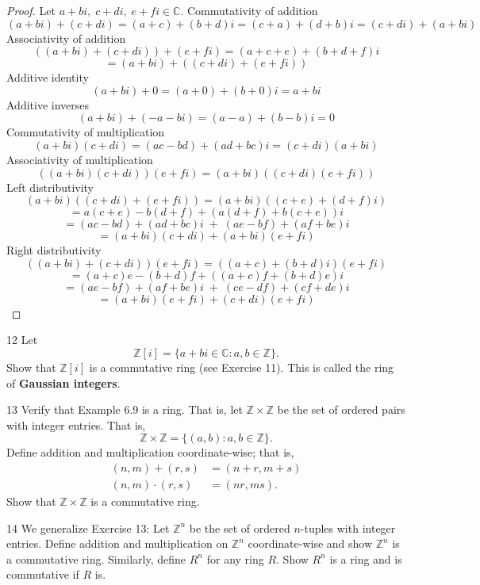 \begin{proof}
    Let $a+bi,\; c+di,\; e+fi \in \mathbb{C}$.
    Commutativity of addition
    \[
    (a+bi)+(c+di)
    = (a+c) + (b+d)i
    = (c+a) + (d+b)i
    = (c+di)+(a+bi)
    \]
    Associativity of addition
    \[
    ((a+bi)+(c+di))+(e+fi)
    = (a+c+e) + (b+d+f)i
    \]
    \[
    = (a+bi) + ((c+di)+(e+fi))
    \]
    Additive identity
    \[
    (a+bi) + 0 = (a+0) + (b+0)i = a+bi
    \]
    Additive inverses
    \[
    (a+bi) + (-a - bi)
    = (a-a) + (b-b)i
    = 0
    \]
    Commutativity of multiplication
    \[
    (a+bi)(c+di)
    = (ac - bd) + (ad + bc)i
    = (c+di)(a+bi)
    \]
    Associativity of multiplication
    \[
    ((a+bi)(c+di))(e+fi)
    = (a+bi)((c+di)(e+fi))
    \]
    Left distributivity
    \[
    (a+bi)((c+di)+(e+fi))
    = (a+bi)((c+e) + (d+f)i)
    \]
    \[
    = a(c+e) - b(d+f) + (a(d+f) + b(c+e))i
    \]
    \[
    = (ac - bd) + (ad + bc)i \;+\; (ae - bf) + (af + be)i
    \]
    \[
    = (a+bi)(c+di) + (a+bi)(e+fi)
    \]
    Right distributivity
    \[
    ((a+bi)+(c+di))(e+fi)
    = ((a+c) + (b+d)i)(e+fi)
    \]
    \[
    = (a+c)e - (b+d)f + ((a+c)f + (b+d)e)i
    \]
    \[
    = (ae - bf) + (af + be)i \;+\; (ce - df) + (cf + de)i
    \]
    \[
    = (a+bi)(e+fi) + (c+di)(e+fi)
    \]
\end{proof}

\begin{problem}{12}
    Let
    \[\mathbb{Z}[i] = \{a + bi \in \mathbb{C} : a, b \in \mathbb{Z}\}.\]
    Show that $\mathbb{Z}[i]$ is a commutative ring (see Exercise 11). This is called
    the ring of \textbf{Gaussian integers}.
\end{problem}
\unsolved

\begin{problem}{13}
    Verify that Example 6.9 is a ring. That is, let $\mathbb{Z} \times \mathbb{Z}$ be the
    set of ordered pairs with integer entries. That is,
    \[\mathbb{Z} \times \mathbb{Z} = \{(a, b) : a, b \in \mathbb{Z}\}.\]
    Define addition and multiplication coordinate-wise; that is,
    \begin{align*}
        (n, m) + (r, s) &= (n + r, m + s) \\
        (n, m) \cdot (r, s) &= (nr, ms).
    \end{align*}
    Show that $\mathbb{Z} \times \mathbb{Z}$ is a commutative ring.
\end{problem}
\unsolved

\begin{problem}{14}
    We generalize Exercise 13: Let $\mathbb{Z}^n$ be the set of ordered $n$-tuples with
    integer entries. Define addition and multiplication on $\mathbb{Z}^n$
    coordinate-wise and show $\mathbb{Z}^n$ is a commutative ring. Similarly, define
    $R^n$ for any ring $R$. Show $R^n$ is a ring and is commutative if $R$ is.
\end{problem}
\unsolved

